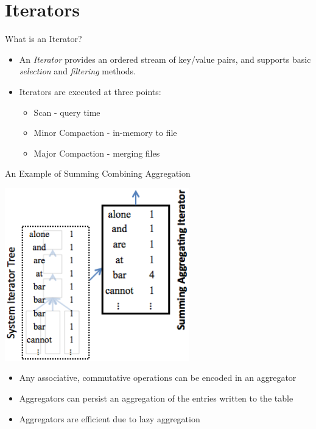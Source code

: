 \documentclass[t,landscape]{beamer}
\begin{document}
\section{Iterators}

\begin{frame}{What is an Iterator?}
\begin{itemize}
\item{An \emph{Iterator} provides an ordered stream of key/value pairs, and supports basic \emph{selection} and \emph{filtering} methods.}
\item{Iterators are executed at three points:}
\begin{itemize}
\item{Scan - query time}
\item{Minor Compaction - in-memory to file}
\item{Major Compaction - merging files}
\end{itemize}
\end{itemize}
\end{frame}

\begin{frame}{An Example of Summing Combining Aggregation}
  \begin{center}
  \includegraphics[width=0.6\textwidth]{images/aggregator.png}
  \end{center}
  \begin{itemize}
    \item{Any associative, commutative operations can be encoded in an aggregator}
    \item{Aggregators can persist an aggregation of the entries written to the table}
    \item{Aggregators are efficient due to lazy aggregation}
  \end{itemize}
\end{frame}
\end{document}
